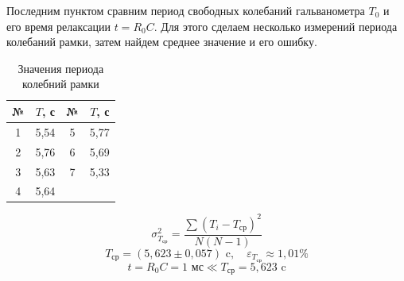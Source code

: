 \documentclass[a4paper,12pt]{article}
\begin{document}
Последним пунктом сравним период свободных колебаний гальванометра $T_0$ и его время релаксации $t = R_0 C$. Для этого сделаем несколько измерений периода колебаний рамки, затем найдем среднее значение и его ошибку.
\begin{table}[H]\label{tab: DataPeriodT}
    \centering
    \begin{tabular}{|c|c|c|c|}
        \hline
        {\color[HTML]{000000} №} & {\color[HTML]{000000} $T$, с} & {\color[HTML]{000000} №} & {\color[HTML]{000000} $T$, с} \\ \hline
        {\color[HTML]{000000} 1} & {\color[HTML]{000000} 5,54} & {\color[HTML]{000000} 5} & {\color[HTML]{000000} 5,77} \\ \hline
        {\color[HTML]{000000} 2} & {\color[HTML]{000000} 5,76} & {\color[HTML]{000000} 6} & {\color[HTML]{000000} 5,69} \\ \hline
        {\color[HTML]{000000} 3} & {\color[HTML]{000000} 5,63} & {\color[HTML]{000000} 7} & {\color[HTML]{000000} 5,33} \\ \hline
        {\color[HTML]{000000} 4} & {\color[HTML]{000000} 5,64} & {\color[HTML]{000000} }  & {\color[HTML]{000000} }     \\ \hline
    \end{tabular}
    \caption{Значения периода колебний рамки}
\end{table}
\[\sigma_{T_{ср}}^2 = \frac{\sum (T_i - T_{ср})^2}{N (N-1)}\]
\[T_{ср} = (5,623 \pm 0,057) \text{ c}, \quad \varepsilon_{T_{ср}} \approx 1,01\%\]
\[t = R_0 C = 1 \text{ мс} \ll T_{ср} = 5,623 \text{ c}\]
\end{document}
